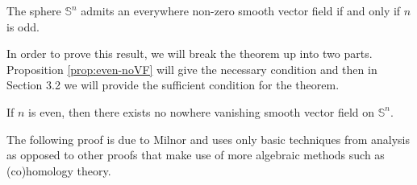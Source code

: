 \documentclass[12pt,a4paper]{article}
\begin{document}
\begin{theorem}
\label{thm:novan-iff-odd}
The sphere $\mathbb{S}^n$ admits an everywhere non-zero smooth vector field if and only if $n$ is odd.
\end{theorem}
In order to prove this result, we will break the theorem up into two parts. Proposition \ref{prop:even-noVF} will give the necessary condition and then in Section 3.2 we will provide the sufficient condition for the theorem.
\begin{proposition}
\label{prop:even-noVF}
If $n$ is even, then there exists no nowhere vanishing smooth vector field on $\mathbb{S}^n$.
\end{proposition}
The following proof is due to Milnor \cite{MR505523} and uses only basic techniques from analysis as opposed to other proofs that make use of more algebraic methods such as (co)homology theory.
\end{document}
